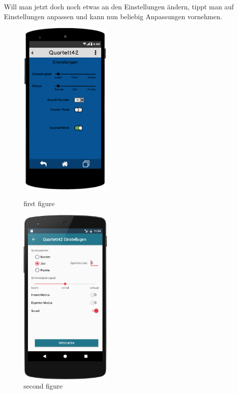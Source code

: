 Will man jetzt doch noch etwas an den Einstellungen ändern, tippt man auf Einstellungen anpassen und kann nun beliebig Anpassungen vornehmen.

\begin{figure}[h]
    \centering
    \begin{minipage}{0.45\textwidth}
        \centering
        \includegraphics[width=0.4\textwidth]{img/mockups/einstellungen.png}
        \caption{first figure}
    \end{minipage}\hfill
    \begin{minipage}{0.45\textwidth}
        \centering
        \includegraphics[width=0.4\textwidth]{img/screenshots/device_settings.png}
        \caption{second figure}
    \end{minipage}
\end{figure}
